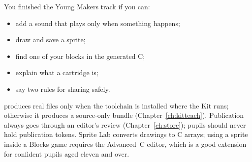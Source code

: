 \begin{prgcheck}
You finished the Young Makers track if you can:
\begin{itemize}
  \item add a sound that plays only when something happens;
  \item draw and save a sprite;
  \item find one of your blocks in the generated C;
  \item explain what a cartridge is;
  \item say two rules for sharing safely.
\end{itemize}
\end{prgcheck}

\begin{prggrownup}
 produces real  files only when the \prg
toolchain is installed where the Kit runs; otherwise it produces a source-only
bundle (Chapter~\ref{ch:kitteach}). Publication always goes through an editor's
review (Chapter~\ref{ch:store}); pupils should never hold publication tokens.
Sprite Lab converts drawings to C arrays; using a sprite inside a Blocks game
requires the Advanced~C editor, which is a good extension for confident pupils
aged eleven and over.
\end{prggrownup}
